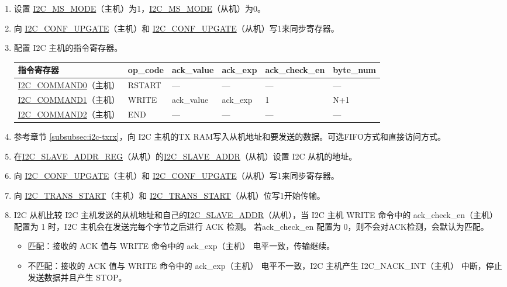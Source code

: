 \documentclass[main\_\_CN.tex]{subfiles}
\begin{document}
\begin{enumerate}
\item 设置 \hyperref[fielddesc:I2CMSMODE]{I2C\_MS\_MODE}（主机）为1，\hyperref[fielddesc:I2CMSMODE]{I2C\_MS\_MODE}（从机）为0。
\item 向 \hyperref[fielddesc:I2CCONFUPGATE]{I2C\_CONF\_UPGATE}（主机）和 \hyperref[fielddesc:I2CCONFUPGATE]{I2C\_CONF\_UPGATE}（从机）写1来同步寄存器。
\item 配置 I2C 主机的指令寄存器。
\begin{longtable}{ | p{4cm} | p{2cm} | p{2cm} | p{2cm} |p{2cm} | p{2cm} |}
\hline\rowcolor{lightgray}
指令寄存器& op\_code & ack\_value&ack\_exp&ack\_check\_en&byte\_num  \\ \hline
\hyperref[fielddesc:I2CCOMMAND0]{I2C\_COMMAND0}（主机）& RSTART& ---&---&---&---  \\ \hline
\hyperref[fielddesc:I2CCOMMAND1]{I2C\_COMMAND1}（主机）& WRITE& ack\_value&ack\_exp&1&N+1  \\ \hline
\hyperref[fielddesc:I2CCOMMAND2]{I2C\_COMMAND2}（主机）& END& ---&---&---&---  \\ \hline
\end{longtable}
\item 参考章节 \ref{subsubsec:i2c-txrx}，向 I2C 主机的TX RAM写入从机地址和要发送的数据。可选FIFO方式和直接访问方式。
\item 在\hyperref[regdesc:I2CSLAVEADDRREG]{I2C\_SLAVE\_ADDR\_REG}（从机）的\hyperref[fielddesc:I2CSLAVEADDR]{I2C\_SLAVE\_ADDR}（从机）设置 I2C 从机的地址。
\item 向 \hyperref[fielddesc:I2CCONFUPGATE]{I2C\_CONF\_UPGATE}（主机）和 \hyperref[fielddesc:I2CCONFUPGATE]{I2C\_CONF\_UPGATE}（从机）写1来同步寄存器。
\item 向 \hyperref[fielddesc:I2CTRANSSTART]{I2C\_TRANS\_START}（主机）和 \hyperref[fielddesc:I2CTRANSSTART]{I2C\_TRANS\_START}（从机）位写1开始传输。
\item I2C 从机比较 I2C 主机发送的从机地址和自己的\hyperref[fielddesc:I2CSLAVEADDR]{I2C\_SLAVE\_ADDR}（从机），当 I2C 主机 WRITE 命令中的 ack\_check\_en（主机） 配置为 1 时，I2C 主机会在发送完每个字节之后进行 ACK 检测。 若ack\_check\_en 配置为 0，则不会对ACK检测，会默认为匹配。
\begin{itemize}
\item 匹配：接收的 ACK 值与 WRITE 命令中的 ack\_exp（主机） 电平一致，传输继续。
\item 不匹配：接收的 ACK 值与 WRITE 命令中的 ack\_exp（主机） 电平不一致，I2C 主机产生 I2C\_NACK\_INT（主机） 中断，停止发送数据并且产生 STOP。
\end{itemize}


\end{enumerate}
\end{document}
